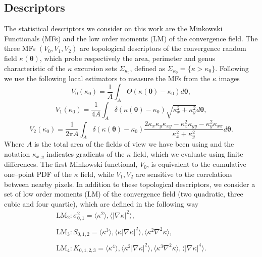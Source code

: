 \documentclass[reprint,aps,prd,superscriptaddress,showkeys]{revtex4-1}
\begin{document}
\subsection{Descriptors}
The statistical descriptors we consider on this work are the Minkowski Functionals (MFs) and the low order moments (LM) of the convergence field. The three MFs $(V_0,V_1,V_2)$ are topological descriptors of the convergence random field $\kappa(\pmb{\theta})$, which probe respectively the area, perimeter and genus characteristic of the $\kappa$ excursion sets $\Sigma_{\kappa_0}$, defined as $\Sigma_{\kappa_0}=\{\kappa>\kappa_0\}$. Following \citep{Petri2013,MinkJan} we use the following local estimators to measure the MFs from the $\kappa$ images
%
\begin{equation*}
\label{v0meas}
V_0(\kappa_0)=\frac{1}{A}\int_A\Theta(\kappa(\pmb{\theta})-\kappa_0)d\pmb{\theta},
\end{equation*}
\begin{equation}
\label{v1meas}
V_1(\kappa_0)=\frac{1}{4A}\int_A\delta(\kappa(\pmb{\theta})-\kappa_0)\sqrt{\kappa_x^2+\kappa_y^2}d\pmb{\theta},
\end{equation}
\begin{equation*}
\label{v2meas}
V_2(\kappa_0)=\frac{1}{2\pi A}\int_A\delta(\kappa(\pmb{\theta})-\kappa_0)\frac{2\kappa_x\kappa_y\kappa_{xy}-\kappa_x^2\kappa_{yy}-\kappa_y^2\kappa_{xx}}{\kappa_x^2+\kappa_y^2}d\pmb{\theta}.
\end{equation*}
%
Where $A$ is the total area of the fields of view we have been using and the notation $\kappa_{x,y}$ indicates gradients of the $\kappa$ field, which we evaluate using finite differences. The first Minkowski functional, $V_0$, is equivalent to the cumulative one--point PDF of the $\kappa$ field, while $V_1,V_2$ are sensitive to the correlations between nearby pixels. In addition to these topological descriptors, we consider a set of low order moments (LM) of the convergence field (two quadratic, three cubic and four quartic), which are defined in the following way
%
\begin{equation}
\begin{matrix}
\mathrm{LM_2}: \sigma_{0,1}^2 = \langle\kappa^2\rangle,\langle\vert\nabla\kappa\vert^2\rangle, \\ \\
\mathrm{LM_3}: S_{0,1,2} = \langle\kappa^3\rangle,\langle\kappa\vert\nabla\kappa\vert^2\rangle,\langle\kappa^2\nabla^2\kappa\rangle, \\ \\
\mathrm{LM_4}: K_{0,1,2,3} = \langle\kappa^4\rangle,\langle\kappa^2\vert\nabla\kappa\vert^2\rangle,\langle\kappa^3\nabla^2\kappa\rangle,\langle\vert\nabla\kappa\vert^4\rangle.
\end{matrix}
\end{equation}
\end{document}
